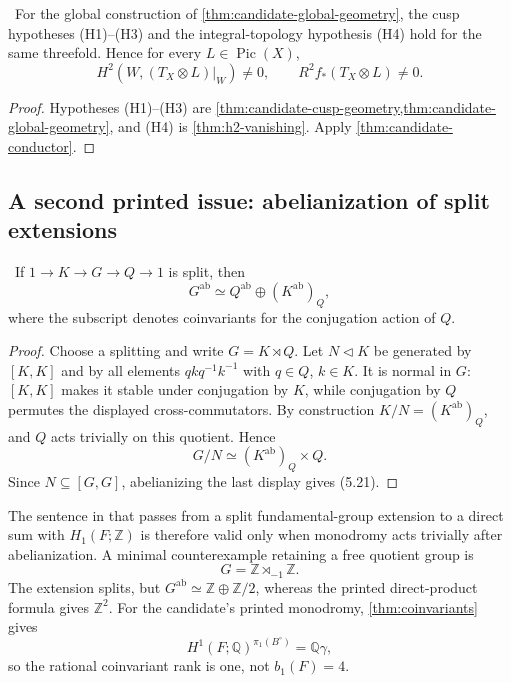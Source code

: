 \begin{corollary}
\label{cor:candidate-conductor-actual}
\Verified\ For the global construction of
\cref{thm:candidate-global-geometry}, the cusp hypotheses (H1)--(H3) and
the integral-topology hypothesis (H4) hold for the same threefold.  Hence
for every $L\in\operatorname{Pic}(X)$,
\[
H^2(W,(T_X\otimes L)|_W)\ne0,
\qquad R^2f_*(T_X\otimes L)\ne0.
\]
\end{corollary}

\begin{proof}
Hypotheses (H1)--(H3) are
\cref{thm:candidate-cusp-geometry,thm:candidate-global-geometry}, and (H4)
is \cref{thm:h2-vanishing}.  Apply
\cref{thm:candidate-conductor}.
\end{proof}

\subsection{A second printed issue: abelianization of split extensions}

\begin{lemma}
\label{lem:semidirect-abelianization}
\Verified\ If
$1\to K\to G\to Q\to1$ is split, then
\[
G^{\mathrm{ab}}\simeq
Q^{\mathrm{ab}}\oplus(K^{\mathrm{ab}})_Q,
\tag{5.21}
\]
where the subscript denotes coinvariants for the conjugation action of $Q$.
\end{lemma}

\begin{proof}
Choose a splitting and write $G=K\rtimes Q$.  Let $N\triangleleft K$ be
generated by $[K,K]$ and by all elements
$qkq^{-1}k^{-1}$ with $q\in Q$, $k\in K$.  It is normal in $G$:
$[K,K]$ makes it stable under conjugation by $K$, while conjugation by
$Q$ permutes the displayed cross-commutators.  By construction
$K/N=(K^{\mathrm{ab}})_Q$, and $Q$ acts trivially on this quotient.  Hence
\[
G/N\simeq(K^{\mathrm{ab}})_Q\times Q.
\]
Since $N\subseteq[G,G]$, abelianizing the last display gives (5.21).
\end{proof}

The sentence in \cite[Lemma~3.2, pp.~84--85]{CDP1998} that passes from a
split fundamental-group extension to a direct sum with $H_1(F;\mathbb Z)$
is therefore valid only when monodromy acts trivially after abelianization.
A minimal counterexample retaining a free quotient group is
\[
G=\mathbb Z\rtimes_{-1}\mathbb Z.
\]
The extension splits, but
$G^{\mathrm{ab}}\simeq\mathbb Z\oplus\mathbb Z/2$, whereas the printed
direct-product formula gives $\mathbb Z^2$.
For the candidate's printed monodromy, \cref{thm:coinvariants} gives
\[
H^1(F;\mathbb Q)^{\pi_1(B^\circ)}=\mathbb Q\gamma,
\]
so the rational coinvariant rank is one, not
$b_1(F)=4$.

